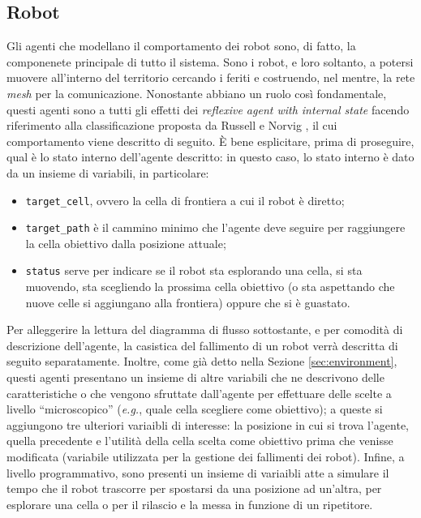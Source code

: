 \subsection{Robot}
\label{sub:robots}
Gli agenti che modellano il comportamento dei robot sono, di fatto, la componenete principale di tutto il sistema.
Sono i robot, e loro soltanto, a potersi muovere all'interno del territorio cercando i feriti e costruendo, nel mentre, la rete \textit{mesh} per la comunicazione. 
Nonostante abbiano un ruolo così fondamentale, questi agenti sono a tutti gli effetti dei \textit{reflexive agent with internal state} facendo riferimento alla classificazione proposta da Russell e Norvig \cite{russell2016}, il cui comportamento viene descritto di seguito.
È bene esplicitare, prima di proseguire, qual è lo stato interno dell'agente descritto: in questo caso, lo stato interno è dato da un insieme di variabili, in particolare:
\begin{itemize}
	\item \texttt{target\_cell}, ovvero la cella di frontiera a cui il robot è diretto;
	\item \texttt{target\_path} è il cammino minimo che l'agente deve seguire per raggiungere la cella obiettivo dalla posizione attuale;
	\item \texttt{status} serve per indicare se il robot sta esplorando una cella, si sta muovendo, sta scegliendo la prossima cella obiettivo (o sta aspettando che nuove celle si aggiungano alla frontiera) oppure che si è guastato.
\end{itemize}
Per alleggerire la lettura del diagramma di flusso sottostante, e per comodità di descrizione dell'agente, la casistica del fallimento di un robot verrà descritta di seguito separatamente.
Inoltre, come già detto nella Sezione \ref{sec:environment}, questi agenti presentano un insieme di altre variabili che ne descrivono delle caratteristiche o che vengono sfruttate dall'agente per effettuare delle scelte a livello “microscopico” (\textit{e.g.}, quale cella scegliere come obiettivo); a queste si aggiungono tre ulteriori variaibli di interesse: la posizione in cui si trova l'agente, quella precedente e l'utilità della cella scelta come obiettivo prima che venisse modificata (variabile utilizzata per la gestione dei fallimenti dei robot).
Infine, a livello programmativo, sono presenti un insieme di variaibli atte a simulare il tempo che il robot trascorre per spostarsi da una posizione ad un'altra, per esplorare una cella o per il rilascio e la messa in funzione di un ripetitore. 

